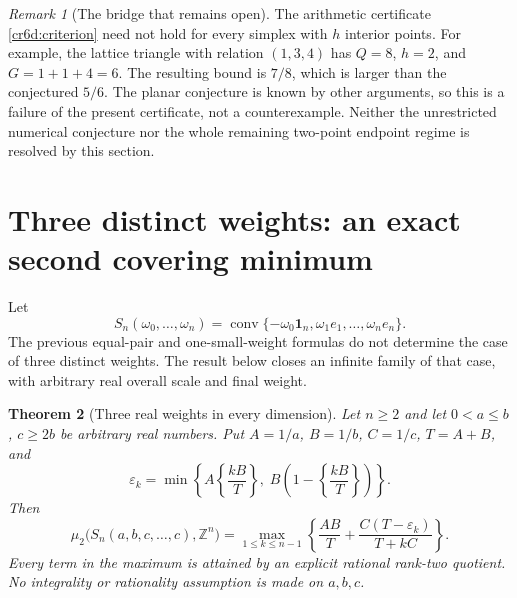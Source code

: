 \documentclass[11pt,a4paper]{article}
\newtheorem{theorem}{Theorem}[section]
\theoremstyle{remark}\newtheorem{remark}[theorem]{Remark}
\DeclareMathOperator{\conv}{conv}
\newcommand{\R}{\mathbb R}\newcommand{\Z}{\mathbb Z}
\begin{document}
\begin{remark}[The bridge that remains open]\label{cr6d:limit}
The arithmetic certificate \eqref{cr6d:criterion} need not
hold for every simplex with $h$ interior points.  For example,
the lattice triangle with relation $(1,3,4)$ has $Q=8$,
$h=2$, and $G=1+1+4=6$.  The resulting bound is $7/8$,
which is larger than the conjectured $5/6$.
The planar conjecture is known by other arguments, so this
is a failure of the present certificate, not a counterexample.
Neither the unrestricted numerical conjecture nor the whole
remaining two-point endpoint regime is resolved by this section.
\end{remark}



\section{Three distinct weights: an exact second covering minimum}
\label{c6w:sec}

Let
\[
 S_n(\omega_0,\ldots,\omega_n)
 =\conv\{-\omega_0\mathbf1_n,\omega_1e_1,\ldots,\omega_ne_n\}.
\]
The previous equal-pair and one-small-weight formulas do not determine
the case of three distinct weights.  The result below closes an infinite
family of that case, with arbitrary real overall scale and final weight.

\begin{theorem}[Three real weights in every dimension]\label{c6w:main}
Let $n\ge2$ and let $0<a\le b$, $c\ge2b$ be arbitrary real
numbers.  Put $A=1/a$, $B=1/b$, $C=1/c$, $T=A+B$, and
\[
 \varepsilon_k=\min\left\{
 A\left\{\frac{kB}{T}\right\},\;
 B\left(1-\left\{\frac{kB}{T}\right\}\right)\right\}.
\]
Then
\begin{equation}\label{c6w:answer}
 \boxed{\displaystyle
 \mu_2\bigl(S_n(a,b,c,\ldots,c),\Z^n\bigr)
 =\max_{1\le k\le n-1}
 \left\{\frac{AB}{T}
 +\frac{C(T-\varepsilon_k)}{T+kC}\right\}.}
\end{equation}
Every term in the maximum is attained by an explicit rational
rank-two quotient.  No integrality or rationality assumption is
made on $a,b,c$.
\end{theorem}
\end{document}
